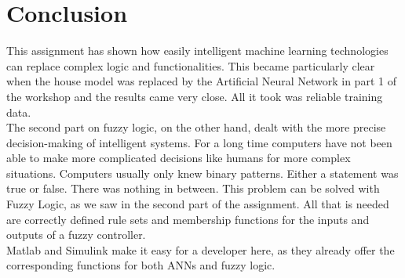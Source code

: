 \chapter{Conclusion}
\label{conlusion}
This assignment has shown how easily intelligent machine learning technologies can replace complex logic and functionalities. This became particularly clear when the house model was replaced by the Artificial Neural Network in part 1 of the workshop and the results came very close. All it took was reliable training data.\\
The second part on fuzzy logic, on the other hand, dealt with the more precise decision-making of intelligent systems. For a long time computers have not been able to make more complicated decisions like humans for more complex situations. Computers usually only knew binary patterns. Either a statement was true or false. There was nothing in between. This problem can be solved with Fuzzy Logic, as we saw in the second part of the assignment. All that is needed are correctly defined rule sets and membership functions for the inputs and outputs of a fuzzy controller. 
\\Matlab and Simulink make it easy for a developer here, as they already offer the corresponding functions for both ANNs and fuzzy logic.


